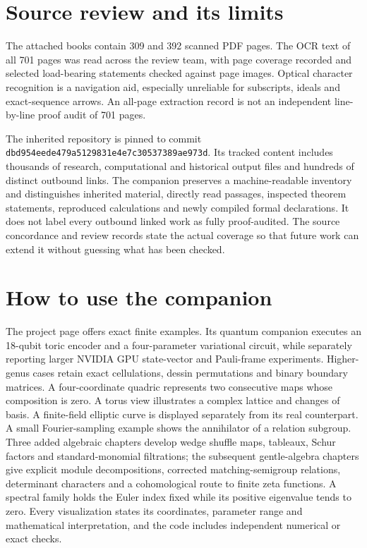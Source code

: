 \section*{Source review and its limits}
The attached books contain 309 and 392 scanned PDF pages. The OCR text of all 701 pages was read across the review team, with page coverage recorded and selected load-bearing statements checked against page images. Optical character recognition is a navigation aid, especially unreliable for subscripts, ideals and exact-sequence arrows. An all-page extraction record is not an independent line-by-line proof audit of 701 pages.

The inherited repository is pinned to commit
\texttt{dbd954eede479a5129831e4e7c30537389ae973d}.
Its tracked content includes thousands of research, computational and historical output files and hundreds of distinct outbound links. The companion preserves a machine-readable inventory and distinguishes inherited material, directly read passages, inspected theorem statements, reproduced calculations and newly compiled formal declarations. It does not label every outbound linked work as fully proof-audited. The source concordance and review records state the actual coverage so that future work can extend it without guessing what has been checked.

\section*{How to use the companion}
The project page offers exact finite examples. Its quantum companion executes an 18-qubit toric encoder and a four-parameter variational circuit, while separately reporting larger NVIDIA GPU state-vector and Pauli-frame experiments. Higher-genus cases retain exact cellulations, dessin permutations and binary boundary matrices. A four-coordinate quadric represents two consecutive maps whose composition is zero. A torus view illustrates a complex lattice and changes of basis. A finite-field elliptic curve is displayed separately from its real counterpart. A small Fourier-sampling example shows the annihilator of a relation subgroup. Three added algebraic chapters develop wedge shuffle maps, tableaux, Schur factors and standard-monomial filtrations; the subsequent gentle-algebra chapters give explicit module decompositions, corrected matching-semigroup relations, determinant characters and a cohomological route to finite zeta functions. A spectral family holds the Euler index fixed while its positive eigenvalue tends to zero. Every visualization states its coordinates, parameter range and mathematical interpretation, and the code includes independent numerical or exact checks.

